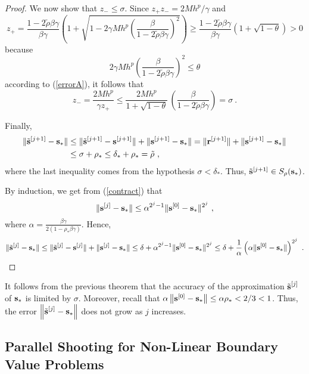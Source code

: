 \begin{proof}
We now show that $z_- \leq \sigma$.  Since $z_+ z_- = 2Mh^p/\gamma$ and
\[
z_+ = \frac{1-2\tilde{\rho}\beta\gamma}{\beta \gamma}
\left( 1 + \sqrt{1 -
2\gamma M h^p\left(\frac{\beta}{1-2\tilde{\rho}\beta\gamma}\right)^2} \right)
\geq \frac{1-2\tilde{\rho}\beta\gamma}{\beta \gamma}
\left( 1 + \sqrt{1 - \theta}\right) > 0
\]
because
\[
  2\gamma M h^p\left(\frac{\beta}{1-2\tilde{\rho}\beta\gamma}\right)^2 \leq
\theta
\]
according to (\ref{errorA}), it follows that
\[
z_- = \frac{2Mh^p}{\gamma z_+} \leq \frac{2Mh^p}{1+\sqrt{1-\theta}} \,
\left( \frac{\beta}{1-2\tilde{\rho}\beta\gamma}\right) = \sigma \ .
\]

Finally,
\begin{align*}
\| \tilde{\mathbf{s}}^{[j+1]} - \mathbf{s}_\ast\|  &\leq
\| \tilde{\mathbf{s}}^{[j+1]} - \mathbf{s}^{[j+1]} \| +
\| \mathbf{s}^{[j+1]} - \mathbf{s}_\ast \|
= \| \mathbf{r}^{[j+1]} \| +
\| \mathbf{s}^{[j+1]} - \mathbf{s}_\ast \| \\
&\leq \sigma + \rho_\ast \leq \delta_\ast + \rho_\ast = \tilde{\rho} \ ,
\end{align*}
where the last inequality comes from the
hypothesis $\sigma < \delta_\ast$.  Thus,
$\tilde{\mathbf{s}}^{[j+1]} \in S_{\rho}(\mathbf{s}_\ast)$.

 By induction, we get from (\ref{contract}) that
\[
  \| \mathbf{s}^{[j]} - \mathbf{s}_\ast \| \leq
  \alpha^{2^j-1}\|\mathbf{s}^{[0]}- \mathbf{s}_\ast\|^{2^j} \ ,
\]
where
$\displaystyle \alpha = \frac{\beta\gamma}{2(1-\rho_\ast \beta\gamma)}$.
Hence,
\[
\| \tilde{\VEC{s}}^{[j]} - \VEC{s}_\ast \| \leq
\| \tilde{\VEC{s}}^{[j]} - \VEC{s}^{[j]} \| +
\| \VEC{s}^{[j]} - \VEC{s}_\ast \|
\leq \delta + \alpha^{2^j-1} \| \VEC{s}^{[0]} - \VEC{s}_\ast \|^{2^j}
\leq \delta + \frac{1}{\alpha}
\left( \alpha \| \VEC{s}^{[0]}-\VEC{s}_\ast  \| \right)^{2^j} \ .  \qedhere
\]
\end{proof}

It follows from the previous theorem that the accuracy of the
approximation $\displaystyle \tilde{\mathbf{s}}^{[j]}$ of $\mathbf{s}_\ast$
is limited by $\sigma$.  Moreover, recall that
$\alpha \left\|\mathbf{s}^{[0]} - \mathbf{s}_\ast\right\|
\leq \alpha \rho_\ast < 2/3 < 1$.  Thus, the error
$\displaystyle \left\| \tilde{\mathbf{s}}^{[j]} - \mathbf{s}_\ast \right\|$
does not grow as $j$ increases.

\subsection{Parallel Shooting for Non-Linear Boundary Value Problems}

